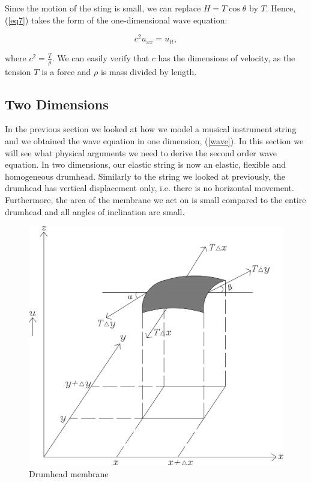 \documentclass[12pt]{article}
\numberwithin{equation}{section}
\begin{document}
Since the motion of the sting is small, we can replace $H=T\cos{\theta}$ by $T$.\cite{BoyDiP} Hence, (\ref{eq7}) takes the 
form of the one-dimensional wave equation:

\begin{equation} \label{wave}
    c^2u_{xx}=u_{tt}, 
\end{equation}

where $c^2=\frac{T}{\rho}$. We can easily verify that $c$ has the dimensions of 
velocity, as the tension $T$ is a force and $\rho$ is mass divided by length.

\subsection{Two Dimensions} \label{twodim}
In the previous section we looked at how we model a musical instrument string and we obtained the wave equation in 
one dimension, (\ref{wave}). In this section we will see what physical arguments we need to derive the second order wave equation.
In two dimensions, our elastic string is now an elastic, flexible and homogeneous drumhead. Similarly to the string we looked at previously, 
the drumhead has vertical displacement only, i.e. there is no horizontal movement. Furthermore, the area of the membrane we act on is small
compared to the entire drumhead and all angles of inclination are small. \cite{Kr}

\begin{figure}[h]
    \centering
    \includegraphics[scale=0.5]{images/grafic-5} 
    \caption{Drumhead membrane}
    \label{fig:2}
\end{figure}
\end{document}
